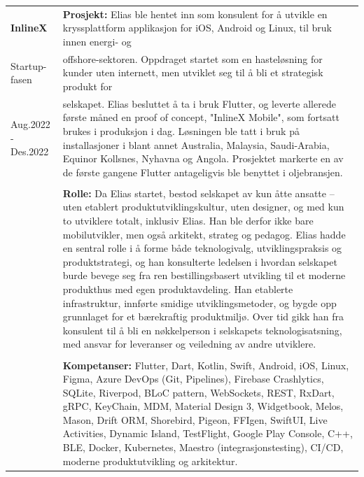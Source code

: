 \documentclass[a4paper,10pt]{article}
\begin{document}
\noindent
\begin{tabular}{@{}p{4cm}p{11cm}@{}}  %
\textbf{InlineX}
& \textbf{Prosjekt:} Elias ble hentet inn som konsulent for å utvikle en kryssplattform applikasjon for iOS, Android og Linux, til bruk innen  energi- og\\
Startup-fasen & offshore-sektoren. Oppdraget startet som en hasteløsning for kunder uten internett, men utviklet seg til å bli et strategisk produkt for \\
Aug.2022 - Des.2022 & selskapet. Elias besluttet å ta i bruk Flutter, og leverte allerede første måned en proof of concept, "InlineX Mobile", som fortsatt brukes i produksjon i dag. Løsningen ble tatt i bruk på installasjoner i blant annet Australia, Malaysia, Saudi-Arabia, Equinor Kollsnes, Nyhavna og Angola. Prosjektet markerte en av de første gangene Flutter antageligvis ble benyttet i oljebransjen.\\
& \\
& \textbf{Rolle:} Da Elias startet, bestod selskapet av kun åtte ansatte – uten etablert produktutviklingskultur, uten designer, og med kun to utviklere totalt, inklusiv Elias. Han ble derfor ikke bare mobilutvikler, men også arkitekt, strateg og pedagog. Elias hadde en sentral rolle i å forme både teknologivalg, utviklingspraksis og produktstrategi, og han konsulterte ledelsen i hvordan selskapet burde bevege seg fra ren bestillingsbasert utvikling til et moderne produkthus med egen produktavdeling. Han etablerte infrastruktur, innførte smidige utviklingsmetoder, og bygde opp grunnlaget for et bærekraftig produktmiljø. Over tid gikk han fra konsulent til å bli en nøkkelperson i selskapets teknologisatsning, med ansvar for leveranser og veiledning av andre utviklere. \\
& \\
& \textbf{Kompetanser:} Flutter, Dart, Kotlin, Swift, Android, iOS, Linux, Figma, Azure DevOps (Git, Pipelines), Firebase Crashlytics, SQLite, Riverpod, BLoC pattern, WebSockets, REST, RxDart, gRPC, KeyChain, MDM, Material Design 3, Widgetbook, Melos, Mason, Drift ORM, Shorebird, Pigeon, FFIgen, SwiftUI, Live Activities, Dynamic Island, TestFlight, Google Play Console, C++, BLE, Docker, Kubernetes, Maestro (integrasjonstesting), CI/CD, moderne produktutvikling og arkitektur. \\

\end{tabular}
\end{document}
